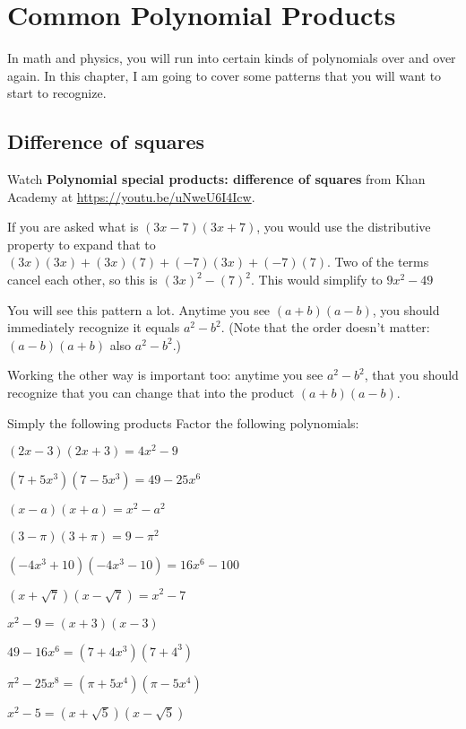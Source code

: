 \chapter{Common Polynomial Products}

In math and physics, you will run into certain kinds of polynomials
over and over again. In this chapter, I am going to cover some
patterns that you will want to start to recognize.

\section{Difference of squares}

Watch \textbf{Polynomial special products: difference of squares} from Khan Academy at \url{https://youtu.be/uNweU6I4Icw}.

If you are asked what is $(3x - 7)(3x + 7)$, you would use the
distributive property to expand that to $(3x)(3x) + (3x)(7) + (-7)(3x) + (-7)(7)$.
Two of the terms cancel each other, so this is $(3x)^2 - (7)^2$. This would simplify to $9x^2 - 49$

You will see this pattern a lot. Anytime you see $(a + b)(a - b)$, you should immediately
recognize it equals $a^2 - b^2$. (Note that the order doesn't matter: $(a - b)(a + b)$ also $a^2 - b^2$.)

Working the other way is important too: anytime you see $a^2 - b^2$, that you should recognize that
you can change that into the product $(a + b)(a - b)$.

\begin{Exercise}[title={Difference of Squares}, label=diffsquares]
  Simply the following products
  Factor the following polynomials:
\end{Exercise}
\begin{Answer}[ref=diffsquares]
  $(2x - 3)(2x + 3) = 4x^2 - 9$
  
  $(7 + 5x^3)(7 - 5x^3) = 49 - 25x^6$
  
  $(x - a)(x + a) = x^2 - a^2$
  
  $(3 - \pi)(3 + \pi) = 9 - \pi^2$
  
  $(-4x^3 + 10)(-4x^3 - 10) = 16x^6 - 100$
  
  $(x + \sqrt{7})(x - \sqrt{7}) = x^2 - 7$

  $x^2 - 9 = (x + 3)(x - 3)$

  $49 - 16x^6 = (7 + 4x^3)(7 + 4^3)$
  
  $\pi^2 - 25x^8 = (\pi + 5x^4)(\pi - 5x^4)$
  
  $x^2 - 5 = (x + \sqrt{5})(x - \sqrt{5})$

\end{Answer}

